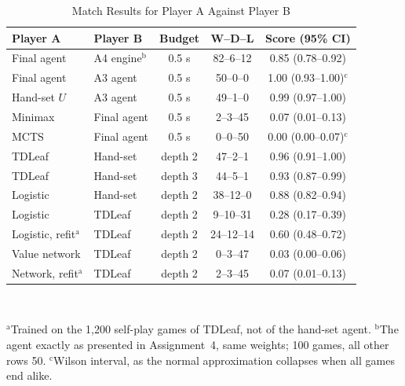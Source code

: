 \documentclass[conference,a4paper]{IEEEtran}
\begin{document}
\begin{table}[!t]
\caption{Match Results for Player A Against Player B}
\label{tab:matches}
\centering
\footnotesize
\setlength{\tabcolsep}{2.9pt}
\begin{tabular}{@{}llccc@{}}
\hline
\textbf{Player A} & \textbf{Player B} & \textbf{Budget} & \textbf{W--D--L} & \textbf{Score (95\% CI)} \\
\hline
Final agent & A4 engine$^{\mathrm{b}}$ & 0.5 s & 82--6--12 & 0.85 (0.78--0.92) \\
Final agent & A3 agent & 0.5 s & 50--0--0 & 1.00 (0.93--1.00)$^{\mathrm{c}}$ \\
Hand-set $U$ & A3 agent & 0.5 s & 49--1--0 & 0.99 (0.97--1.00) \\
Minimax & Final agent & 0.5 s & 2--3--45 & 0.07 (0.01--0.13) \\
MCTS & Final agent & 0.5 s & 0--0--50 & 0.00 (0.00--0.07)$^{\mathrm{c}}$ \\
\hline
TDLeaf & Hand-set & depth 2 & 47--2--1 & 0.96 (0.91--1.00) \\
TDLeaf & Hand-set & depth 3 & 44--5--1 & 0.93 (0.87--0.99) \\
\hline
Logistic & Hand-set & depth 2 & 38--12--0 & 0.88 (0.82--0.94) \\
Logistic & TDLeaf & depth 2 & 9--10--31 & 0.28 (0.17--0.39) \\
Logistic, refit$^{\mathrm{a}}$ & TDLeaf & depth 2 & 24--12--14 & 0.60 (0.48--0.72) \\
Value network & TDLeaf & depth 2 & 0--3--47 & 0.03 (0.00--0.06) \\
Network, refit$^{\mathrm{a}}$ & TDLeaf & depth 2 & 2--3--45 & 0.07 (0.01--0.13) \\
\hline
\end{tabular}\\[1pt]
\parbox{\columnwidth}{\scriptsize $^{\mathrm{a}}$Trained on the 1,200 self-play games of TDLeaf, not of the hand-set agent. $^{\mathrm{b}}$The agent exactly as presented in Assignment~4, same weights; 100 games, all other rows 50. $^{\mathrm{c}}$Wilson interval, as the normal approximation collapses when all games end alike.}
\end{table}
\end{document}

